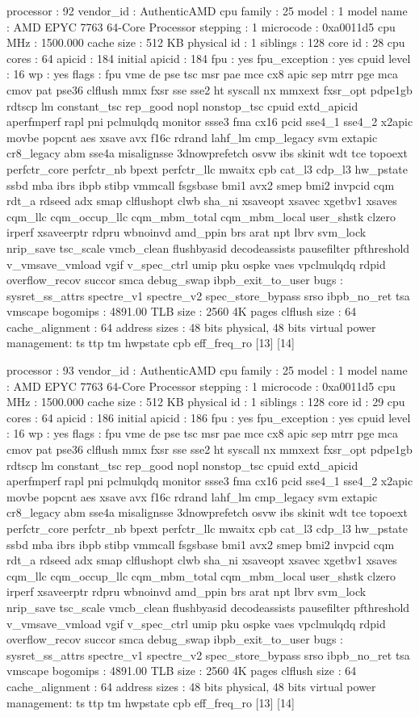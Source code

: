 processor	: 92
vendor_id	: AuthenticAMD
cpu family	: 25
model		: 1
model name	: AMD EPYC 7763 64-Core Processor
stepping	: 1
microcode	: 0xa0011d5
cpu MHz		: 1500.000
cache size	: 512 KB
physical id	: 1
siblings	: 128
core id		: 28
cpu cores	: 64
apicid		: 184
initial apicid	: 184
fpu		: yes
fpu_exception	: yes
cpuid level	: 16
wp		: yes
flags		: fpu vme de pse tsc msr pae mce cx8 apic sep mtrr pge mca cmov pat pse36 clflush mmx fxsr sse sse2 ht syscall nx mmxext fxsr_opt pdpe1gb rdtscp lm constant_tsc rep_good nopl nonstop_tsc cpuid extd_apicid aperfmperf rapl pni pclmulqdq monitor ssse3 fma cx16 pcid sse4_1 sse4_2 x2apic movbe popcnt aes xsave avx f16c rdrand lahf_lm cmp_legacy svm extapic cr8_legacy abm sse4a misalignsse 3dnowprefetch osvw ibs skinit wdt tce topoext perfctr_core perfctr_nb bpext perfctr_llc mwaitx cpb cat_l3 cdp_l3 hw_pstate ssbd mba ibrs ibpb stibp vmmcall fsgsbase bmi1 avx2 smep bmi2 invpcid cqm rdt_a rdseed adx smap clflushopt clwb sha_ni xsaveopt xsavec xgetbv1 xsaves cqm_llc cqm_occup_llc cqm_mbm_total cqm_mbm_local user_shstk clzero irperf xsaveerptr rdpru wbnoinvd amd_ppin brs arat npt lbrv svm_lock nrip_save tsc_scale vmcb_clean flushbyasid decodeassists pausefilter pfthreshold v_vmsave_vmload vgif v_spec_ctrl umip pku ospke vaes vpclmulqdq rdpid overflow_recov succor smca debug_swap ibpb_exit_to_user
bugs		: sysret_ss_attrs spectre_v1 spectre_v2 spec_store_bypass srso ibpb_no_ret tsa vmscape
bogomips	: 4891.00
TLB size	: 2560 4K pages
clflush size	: 64
cache_alignment	: 64
address sizes	: 48 bits physical, 48 bits virtual
power management: ts ttp tm hwpstate cpb eff_freq_ro [13] [14]

processor	: 93
vendor_id	: AuthenticAMD
cpu family	: 25
model		: 1
model name	: AMD EPYC 7763 64-Core Processor
stepping	: 1
microcode	: 0xa0011d5
cpu MHz		: 1500.000
cache size	: 512 KB
physical id	: 1
siblings	: 128
core id		: 29
cpu cores	: 64
apicid		: 186
initial apicid	: 186
fpu		: yes
fpu_exception	: yes
cpuid level	: 16
wp		: yes
flags		: fpu vme de pse tsc msr pae mce cx8 apic sep mtrr pge mca cmov pat pse36 clflush mmx fxsr sse sse2 ht syscall nx mmxext fxsr_opt pdpe1gb rdtscp lm constant_tsc rep_good nopl nonstop_tsc cpuid extd_apicid aperfmperf rapl pni pclmulqdq monitor ssse3 fma cx16 pcid sse4_1 sse4_2 x2apic movbe popcnt aes xsave avx f16c rdrand lahf_lm cmp_legacy svm extapic cr8_legacy abm sse4a misalignsse 3dnowprefetch osvw ibs skinit wdt tce topoext perfctr_core perfctr_nb bpext perfctr_llc mwaitx cpb cat_l3 cdp_l3 hw_pstate ssbd mba ibrs ibpb stibp vmmcall fsgsbase bmi1 avx2 smep bmi2 invpcid cqm rdt_a rdseed adx smap clflushopt clwb sha_ni xsaveopt xsavec xgetbv1 xsaves cqm_llc cqm_occup_llc cqm_mbm_total cqm_mbm_local user_shstk clzero irperf xsaveerptr rdpru wbnoinvd amd_ppin brs arat npt lbrv svm_lock nrip_save tsc_scale vmcb_clean flushbyasid decodeassists pausefilter pfthreshold v_vmsave_vmload vgif v_spec_ctrl umip pku ospke vaes vpclmulqdq rdpid overflow_recov succor smca debug_swap ibpb_exit_to_user
bugs		: sysret_ss_attrs spectre_v1 spectre_v2 spec_store_bypass srso ibpb_no_ret tsa vmscape
bogomips	: 4891.00
TLB size	: 2560 4K pages
clflush size	: 64
cache_alignment	: 64
address sizes	: 48 bits physical, 48 bits virtual
power management: ts ttp tm hwpstate cpb eff_freq_ro [13] [14]

